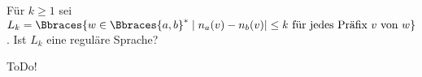 
\begin{exercise}

Für $k \geq 1$ sei $L_k = \Bbraces{w \in \Bbraces{a, b}^\ast \mid n_a(v) - n_b(v)| \leq k ~\text{für jedes Präfix}~ v ~\text{von}~ w}$.
Ist $L_k$ eine reguläre Sprache?

\end{exercise}


\begin{solution}

ToDo!

\end{solution}

